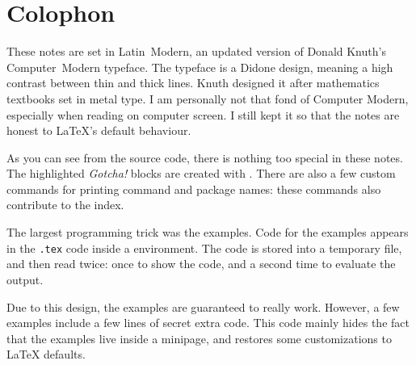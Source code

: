 \chapter*{Colophon}

These notes are set in Latin~Modern,
an updated version of Donald Knuth's Computer~Modern typeface.
The typeface is a Didone design, meaning a high contrast between thin and thick lines.
Knuth designed it after mathematics textbooks set in metal type.
I am personally not that fond of Computer Modern,
especially when reading on computer screen.
I still kept it so that the notes are honest to \LaTeX's default behaviour.

As you can see from the source code,
there is nothing too special in these notes.
The highlighted \emph{Gotcha!} blocks are created with .
There are also a few custom commands for printing command and package names:
these commands also contribute to the index.

The largest programming trick was the examples.
Code for the examples appears in the \verb|.tex| code inside a  environment.
The code is stored into a temporary file, and then read twice:
once to show the code, and a second time to evaluate the output.

Due to this design, the examples are guaranteed to really work.
However, a few examples include a few lines of secret extra code.
This code mainly hides the fact that the examples live inside a minipage,
and restores some customizations to \LaTeX{} defaults.
